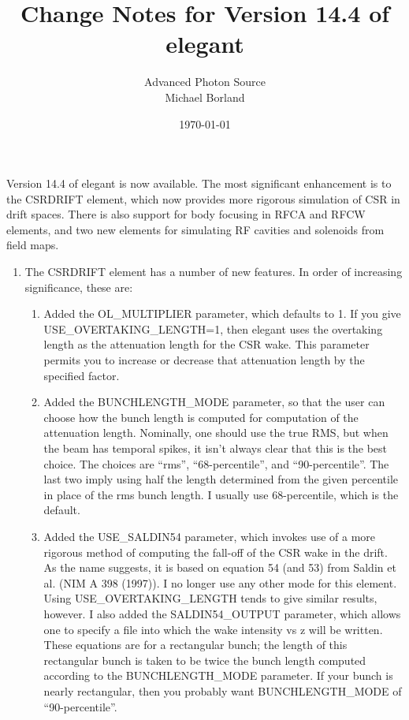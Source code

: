 \documentclass[11pt]{article}
\begin{document}
\title{Change Notes for Version 14.4 of elegant}
\author{Advanced Photon Source\\Michael Borland\\ \date{\today}}
\maketitle

Version 14.4 of elegant is now available.  The most significant
enhancement is to the CSRDRIFT element, which now provides more
rigorous simulation of CSR in drift spaces.  There is also support for
body focusing in RFCA and RFCW elements, and two new elements for
simulating RF cavities and solenoids from field maps.

\begin{enumerate}
\item The CSRDRIFT element has a number of new features.  In order of
increasing significance, these are:
\begin{enumerate}
\item  Added the OL\_MULTIPLIER parameter, which defaults to 1.  If you
give \\ USE\_OVERTAKING\_LENGTH=1, then elegant uses the overtaking length
as the attenuation length for the CSR wake.  This parameter permits
you to increase or decrease that attenuation length by the specified
factor.

\item  Added the BUNCHLENGTH\_MODE parameter, so that the user can choose
how the bunch length is computed for computation of the attenuation
length.  Nominally, one should use the true RMS, but when the beam has
temporal spikes, it isn't always clear that this is the best choice.
The choices are ``rms'', ``68-percentile'', and ``90-percentile''.  The last
two imply using half the length determined from the given percentile
in place of the rms bunch length.  I usually use 68-percentile, which
is the default.
\item  Added the USE\_SALDIN54 parameter, which invokes use of a more
rigorous method of computing the fall-off of the CSR wake in the
drift.  As the name suggests, it is based on equation 54 (and 53) from
Saldin et al. (NIM A 398 (1997)).  I no longer use any other mode for
this element.  Using USE\_OVERTAKING\_LENGTH tends to give similar
results, however.  I also added the SALDIN54\_OUTPUT parameter, which
allows one to specify a file into which the wake intensity vs z will
be written.  These equations are for a rectangular bunch; the length 
of this rectangular bunch is taken to be twice the bunch length
computed according to the BUNCHLENGTH\_MODE parameter.  If your 
bunch is nearly rectangular, then you probably want BUNCHLENGTH\_MODE
of ``90-percentile''.
\end{enumerate}


\end{enumerate}
\end{document}
